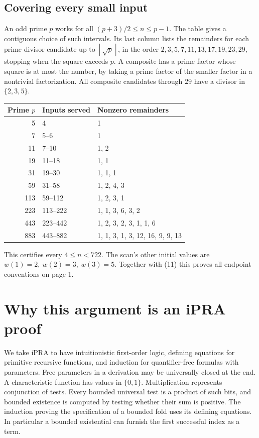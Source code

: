 \documentclass[12pt,letterpaper]{article}
\newcommand{\w}{w}
\newcommand{\fl}[1]{\left\lfloor #1\right\rfloor}
\newcommand{\pagepart}{\clearpage}
\begin{document}
\subsection*{Covering every small input}
An odd prime \(p\) works for all \((p+3)/2\le n\le p-1\). The table gives a contiguous choice of such intervals. Its last column lists the remainders for each prime divisor candidate up to \(\fl{\sqrt p}\), in the order \(2,3,5,7,11,13,17,19,23,29\), stopping when the square exceeds \(p\). A composite has a prime factor whose square is at most the number, by taking a prime factor of the smaller factor in a nontrivial factorization. All composite candidates through \(29\) have a divisor in \(\{2,3,5\}\).
\begin{center}\small
\begin{tabular}{@{}r@{\qquad}l@{\qquad}l@{}}
\toprule
\textsf{Prime \(p\)} & \textsf{Inputs served} & \textsf{Nonzero remainders}\\ \midrule
5 & 4 & 1\\
7 & 5--6 & 1\\
11 & 7--10 & 1, 2\\
19 & 11--18 & 1, 1\\
31 & 19--30 & 1, 1, 1\\
59 & 31--58 & 1, 2, 4, 3\\
113 & 59--112 & 1, 2, 3, 1\\
223 & 113--222 & 1, 1, 3, 6, 3, 2\\
443 & 223--442 & 1, 2, 3, 2, 3, 1, 1, 6\\
883 & 443--882 & 1, 1, 3, 1, 3, 12, 16, 9, 9, 13\\
\bottomrule
\end{tabular}
\end{center}
This certifies every \(4\le n<722\). The scan's other initial values are \(\w(1)=2,\ \w(2)=3,\ \w(3)=5\). Together with (11) this proves all endpoint conventions on page 1.

\pagepart\section{Why this argument is an iPRA proof}\label{s:ipra}
We take iPRA to have intuitionistic first-order logic, defining equations for primitive recursive functions, and induction for quantifier-free formulas with parameters. Free parameters in a derivation may be universally closed at the end. A characteristic function has values in \(\{0,1\}\). Multiplication represents conjunction of tests. Every bounded universal test is a product of such bits, and bounded existence is computed by testing whether their sum is positive. The induction proving the specification of a bounded fold uses its defining equations. In particular a bounded existential can furnish the first successful index as a term.
\end{document}
